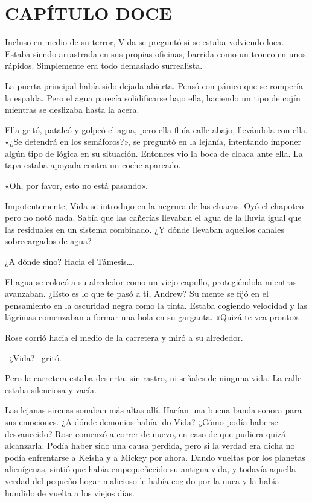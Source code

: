 \chapter*{CAPÍTULO DOCE}

{Incluso en medio de su terror, Vida se preguntó si se estaba volviendo
 loca. Estaba siendo arrastrada en sus propias oficinas, barrida como un
tronco en unos rápidos. Simplemente era todo demasiado surrealista.}

{La puerta principal había sido dejada abierta. Pensó con pánico que se
 rompería la espalda. Pero el agua parecía solidificarse bajo ella,
haciendo un tipo de cojín mientras se deslizaba hasta la acera.}

{Ella gritó, pataleó y golpeó el agua, pero ella fluía calle abajo,
 llevándola con ella. «¿Se detendrá en los semáforos?», se preguntó en la
 lejanía, intentando imponer algún tipo de lógica en su situación.
 Entonces vio la boca de cloaca ante ella. La tapa estaba apoyada contra
un coche aparcado.}

{«Oh, por favor, esto no está pasando».}

{Impotentemente, Vida se introdujo en la negrura de las cloacas. Oyó el
 chapoteo pero no notó nada. Sabía que las cañerías llevaban el agua de
 la lluvia igual que las residuales en un sistema combinado. ¿Y dónde
llevaban aquellos canales sobrecargados de agua?}

{¿A dónde sino? Hacia el Támesis\ldots{}.}

{El agua se colocó a su alrededor como un viejo capullo, protegiéndola
 mientras avanzaban. ¿Esto es lo que te pasó a ti, Andrew? Su mente se
 fijó en el pensamiento en la oscuridad negra como la tinta. Estaba
 cogiendo velocidad y las lágrimas comenzaban a formar una bola en su
garganta. «Quizá te vea pronto».}

\mbox{}

{Rose corrió hacia el medio de la carretera y miró a su alrededor.}

{--¿Vida? --gritó.}

{Pero la carretera estaba desierta: sin rastro, ni señales de ninguna
vida. La calle estaba silenciosa y vacía.}

{Las lejanas sirenas sonaban más altas allí. Hacían una buena banda
 sonora para sus emociones. ¿A dónde demonios había ido Vida? ¿Cómo podía
 haberse desvanecido? Rose comenzó a correr de nuevo, en caso de que
 pudiera quizá alcanzarla. Podía haber sido una causa perdida, pero si la
 verdad era dicha no podía enfrentarse a Keisha y a Mickey por ahora.
 Dando vueltas por los planetas alienígenas, sintió que había
 empequeñecido su antigua vida, y todavía aquella verdad del pequeño
 hogar malicioso le había cogido por la nuca y la había hundido de vuelta
a los viejos días.}

